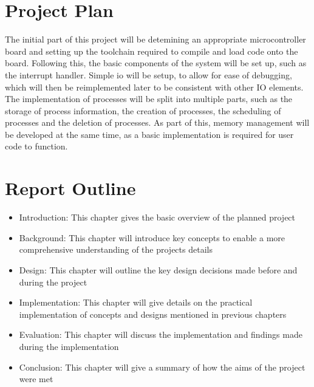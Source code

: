 \section{Project Plan}
The initial part of this project will be detemining an appropriate microcontroller board and setting up the toolchain required to compile and load code onto the board. Following this, the basic components of the system will be set up, such as the interrupt handler. Simple \ac{io} will be setup, to allow for ease of debugging, which will then be reimplemented later to be consistent with other IO elements. The implementation of processes will be split into multiple parts, such as the storage of process information, the creation of processes, the scheduling of processes and the deletion of processes. As part of this, memory management will be developed at the same time, as a basic implementation is required for user code to function.

\section{Report Outline}
\begin{itemize}
    \item Introduction: This chapter gives the basic overview of the planned project
    \item Background: This chapter will introduce key concepts to enable a more comprehensive understanding of the projects details
    \item Design: This chapter will outline the key design decisions made before and during the project
    \item Implementation: This chapter will give details on the practical implementation of concepts and designs mentioned in previous chapters
    \item Evaluation: This chapter will discuss the implementation and findings made during the implementation
    \item Conclusion: This chapter will give a summary of how the aims of the project were met 
\end{itemize}

